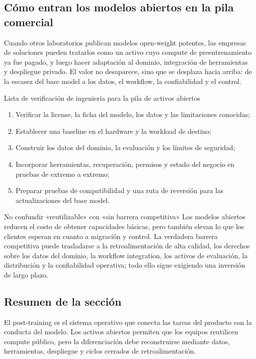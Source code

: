 \subsection{Cómo entran los modelos abiertos en la pila comercial}

Cuando otros laboratorios publican modelos open-weight potentes, las empresas de soluciones pueden tratarlos como un activo cuyo compute de preentrenamiento ya fue pagado, y luego hacer adaptación al dominio, integración de herramientas y despliegue privado. El valor no desaparece, sino que se desplaza hacia arriba: de la escasez del base model a los datos, el workflow, la confiabilidad y el control.


\begin{importantbox}{Lista de verificación de ingeniería para la pila de activos abiertos}
\begin{enumerate}
  \item Verificar la license, la ficha del modelo, los datos y las limitaciones conocidas;
  \item Establecer una baseline en el hardware y la workload de destino;
  \item Construir los datos del dominio, la evaluación y los límites de seguridad;
  \item Incorporar herramientas, recuperación, permisos y estado del negocio en pruebas de extremo a extremo;
  \item Preparar pruebas de compatibilidad y una ruta de reversión para las actualizaciones del base model.
\end{enumerate}
\end{importantbox}

\begin{warningbox}{No confundir «reutilizable» con «sin barrera competitiva»}
Los modelos abiertos reducen el costo de obtener capacidades básicas, pero también elevan lo que los clientes esperan en cuanto a migración y control. La verdadera barrera competitiva puede trasladarse a la retroalimentación de alta calidad, los derechos sobre los datos del dominio, la workflow integration, los activos de evaluación, la distribución y la confiabilidad operativa; todo ello sigue exigiendo una inversión de largo plazo.
\end{warningbox}

\subsection{Resumen de la sección}

El post-training es el sistema operativo que conecta las tareas del producto con la conducta del modelo. Los activos abiertos permiten que los equipos reutilicen compute público, pero la diferenciación debe reconstruirse mediante datos, herramientas, despliegue y ciclos cerrados de retroalimentación.
